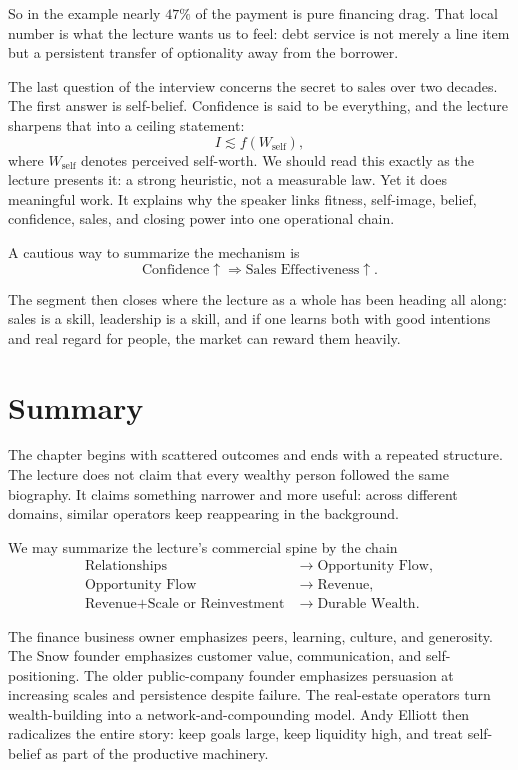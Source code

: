 So in the example nearly \(47\%\) of the payment is pure financing drag. That local number is what the lecture wants us to feel: debt service is not merely a line item but a persistent transfer of optionality away from the borrower.

The last question of the interview concerns the secret to sales over two decades. The first answer is self-belief. Confidence is said to be everything, and the lecture sharpens that into a ceiling statement:
\begin{equation}
I \lesssim f(W_{\text{self}}),
\end{equation}
where \(W_{\text{self}}\) denotes perceived self-worth. We should read this exactly as the lecture presents it: a strong heuristic, not a measurable law. Yet it does meaningful work. It explains why the speaker links fitness, self-image, belief, confidence, sales, and closing power into one operational chain.

A cautious way to summarize the mechanism is
\begin{equation}
\text{Confidence} \uparrow \Rightarrow \text{Sales Effectiveness} \uparrow.
\end{equation}

The segment then closes where the lecture as a whole has been heading all along: sales is a skill, leadership is a skill, and if one learns both with good intentions and real regard for people, the market can reward them heavily.

\section{Summary}

The chapter begins with scattered outcomes and ends with a repeated structure. The lecture does not claim that every wealthy person followed the same biography. It claims something narrower and more useful: across different domains, similar operators keep reappearing in the background.

We may summarize the lecture's commercial spine by the chain
\begin{align}
\text{Relationships} &\to \text{Opportunity Flow}, \\
\text{Opportunity Flow} &\to \text{Revenue}, \\
\text{Revenue}+\text{Scale or Reinvestment} &\to \text{Durable Wealth}.
\end{align}

The finance business owner emphasizes peers, learning, culture, and generosity. The Snow founder emphasizes customer value, communication, and self-positioning. The older public-company founder emphasizes persuasion at increasing scales and persistence despite failure. The real-estate operators turn wealth-building into a network-and-compounding model. Andy Elliott then radicalizes the entire story: keep goals large, keep liquidity high, and treat self-belief as part of the productive machinery.

